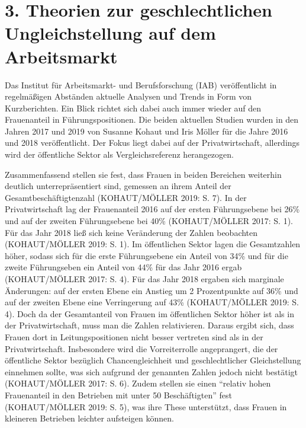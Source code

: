 \documentclass[a4paper,
fontsize=11pt,
oneside,
numbers=noperiodatend,
parskip=half-,
bibliography=totoc,
final
]{scrartcl}
\begin{document}
\hypertarget{theorien-zur-geschlechtlichen-ungleichstellung-auf-dem-arbeitsmarkt}{%
\section{3. Theorien zur geschlechtlichen Ungleichstellung auf dem
Arbeitsmarkt}\label{theorien-zur-geschlechtlichen-ungleichstellung-auf-dem-arbeitsmarkt}}

Das Institut für Arbeitsmarkt- und Berufsforschung (IAB) veröffentlicht
in regelmäßigen Abständen aktuelle Analysen und Trends in Form von
Kurzberichten. Ein Blick richtet sich dabei auch immer wieder auf den
Frauenanteil in Führungspositionen. Die beiden aktuellen Studien wurden
in den Jahren 2017 und 2019 von Susanne Kohaut und Iris Möller für die
Jahre 2016 und 2018 veröffentlicht. Der Fokus liegt dabei auf der
Privatwirtschaft, allerdings wird der öffentliche Sektor als
Vergleichsreferenz herangezogen.

Zusammenfassend stellen sie fest, dass Frauen in beiden Bereichen
weiterhin deutlich unterrepräsentiert sind, gemessen an ihrem Anteil der
Gesamtbeschäftigtenzahl (KOHAUT/MÖLLER 2019: S. 7). In der
Privatwirtschaft lag der Frauenanteil 2016 auf der ersten Führungsebene
bei 26\% und auf der zweiten Führungsebene bei 40\% (KOHAUT/MÖLLER 2017:
S. 1). Für das Jahr 2018 ließ sich keine Veränderung der Zahlen
beobachten (KOHAUT/MÖLLER 2019: S. 1). Im öffentlichen Sektor lagen die
Gesamtzahlen höher, sodass sich für die erste Führungsebene ein Anteil
von 34\% und für die zweite Führungseben ein Anteil von 44\% für das
Jahr 2016 ergab (KOHAUT/MÖLLER 2017: S. 4). Für das Jahr 2018 ergaben
sich marginale Änderungen: auf der ersten Ebene ein Anstieg um 2
Prozentpunkte auf 36\% und auf der zweiten Ebene eine Verringerung auf
43\% (KOHAUT/MÖLLER 2019: S. 4). Doch da der Gesamtanteil von Frauen im
öffentlichen Sektor höher ist als in der Privatwirtschaft, muss man die
Zahlen relativieren. Daraus ergibt sich, dass Frauen dort in
Leitungspositionen nicht besser vertreten sind als in der
Privatwirtschaft. Insbesondere wird die Vorreiterrolle angeprangert, die
der öffentliche Sektor bezüglich Chancengleichheit und geschlechtlicher
Gleichstellung einnehmen sollte, was sich aufgrund der genannten Zahlen
jedoch nicht bestätigt (KOHAUT/MÖLLER 2017: S. 6). Zudem stellen sie
einen \enquote{relativ hohen Frauenanteil in den Betrieben mit unter 50
Beschäftigten} fest (KOHAUT/MÖLLER 2019: S. 5), was ihre These
unterstützt, dass Frauen in kleineren Betrieben leichter aufsteigen
können.
\end{document}

